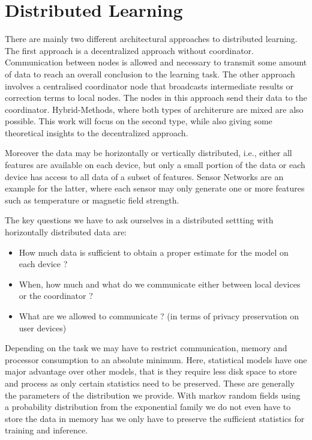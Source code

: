 \section{Distributed Learning}
There are mainly two different architectural approaches to distributed learning. 
The first approach is a decentralized approach without coordinator.
Communication between nodes is allowed and necessary to transmit some amount of data to reach an overall conclusion to the learning task.
The other approach involves a centralised coordinator node that broadcasts intermediate results or correction terms to local nodes.
The nodes in this approach send their data to the coordinator. 
Hybrid-Methods, where both types of architerure are mixed are also possible.
This work will focus on the second type, while also giving some theoretical insights to the decentralized approach.

Moreover the data may be horizontally or vertically distributed, i.e., either all features are available on each device, but only a small portion of the data or each device has access to all data of a subset of features.
Sensor Networks are an example for the latter, where each sensor may only generate one or more features such as temperature or magnetic field strength.

The key questions we have to ask ourselves in a distributed settting with horizontally distributed data are:
\begin{itemize}
    \item How much data is sufficient to obtain a proper estimate for the model on each device ? 
    \item When, how much and what do we communicate either between local devices or the coordinator ?
    \item What are we allowed to communicate ? (in terms of privacy preservation on user devices)
\end{itemize}

Depending on the task we may have to restrict communication, memory and processor consumption to an absolute minimum.
Here, statistical models have one major advantage over other models, that is they require less disk space to store and process as only certain statistics need to be preserved.
These are generally the parameters of the distribution we provide.
With markov random fields using a probability distribution from the exponential family we do not even have to store the data in memory has we only have to preserve the sufficient statistics for training and inference.

